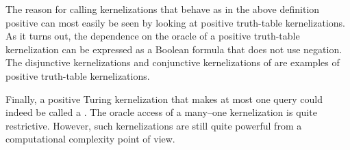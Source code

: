 The reason for calling kernelizations that behave as in the above definition positive can most easily be seen by looking at positive truth-table kernelizations.
As it turns out, the dependence on the oracle of a positive truth-table kernelization can be expressed as a Boolean formula that does not use negation.
The disjunctive kernelizations and conjunctive kernelizations of \textcite{kratsch2014recent} are examples of positive truth-table kernelizations.

Finally, a positive Turing kernelization that makes at most one query could indeed be called a .
The oracle access of a many--one kernelization is quite restrictive.
However, such kernelizations are still quite powerful from a computational complexity point of view.

